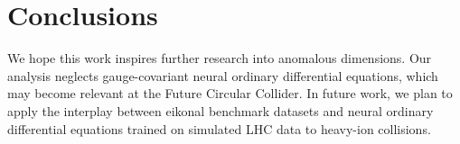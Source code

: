\section{Conclusions}\label{sec:conclusions}

We hope this work inspires further research into anomalous dimensions.
Our analysis neglects gauge-covariant neural ordinary differential
equations, which may become relevant at the Future Circular Collider. In
future work, we plan to apply the interplay between eikonal benchmark
datasets and neural ordinary differential equations trained on simulated
LHC data to heavy-ion collisions.

